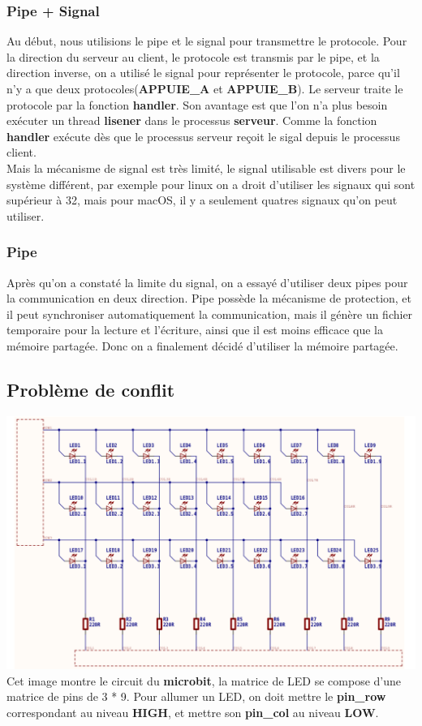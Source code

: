 \documentclass[14px]{article}
\begin{document}
\subsubsection{Pipe + Signal}
Au début, nous utilisions le pipe et le signal pour transmettre le protocole. Pour la direction du serveur au client, le protocole est transmis par le pipe, et la direction inverse, on a utilisé le signal pour représenter le protocole, parce qu'il n'y a que deux protocoles(\textbf{APPUIE\_A} et \textbf{APPUIE\_B}). Le serveur traite le protocole par la fonction \textbf{handler}.
Son avantage est que l'on n'a plus besoin exécuter un thread \textbf{lisener} dans le processus \textbf{serveur}. Comme la fonction \textbf{handler} exécute dès que le processus serveur reçoit le sigal depuis le processus client. \\
Mais la mécanisme de signal est très limité, le signal utilisable est divers pour le système différent, par exemple pour linux on a droit d'utiliser les signaux qui sont supérieur à 32, mais pour macOS, il y a seulement quatres signaux qu'on peut utiliser.

\subsubsection{Pipe}
Après qu'on a constaté la limite du signal, on a essayé d'utiliser deux pipes pour la communication en deux direction. Pipe possède la mécanisme de protection, et il peut  synchroniser automatiquement la communication, mais il génère un fichier temporaire pour la lecture et l'écriture, ainsi que il est moins efficace que la mémoire partagée. Donc on a finalement décidé d'utiliser la mémoire partagée.

\clearpage

\subsection{Problème de conflit}

\includegraphics[width=\textwidth]{pbConflitPins.png}
Cet image montre le circuit du \textbf{microbit}, la matrice de LED se compose d'une matrice de pins de 3 * 9. Pour allumer un LED, on doit mettre le \textbf{pin\_row} correspondant au niveau \textbf{HIGH}, et mettre son \textbf{pin\_col} au niveau \textbf{LOW}.
\end{document}
